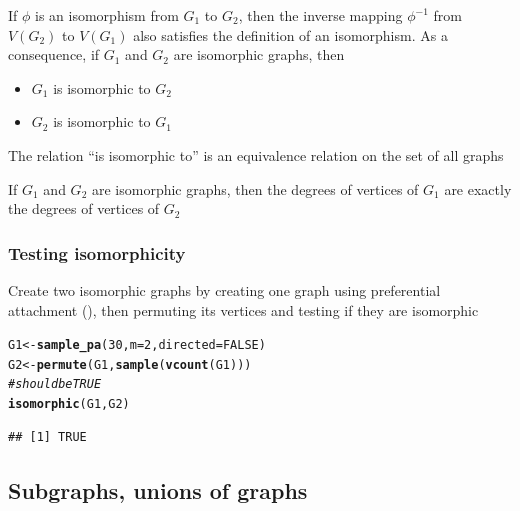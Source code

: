 \documentclass[aspectratio=169]{beamer}\usepackage[]{graphicx}\usepackage[]{xcolor}
\makeatletter
\newcommand{\hlnum}[1]{\textcolor[rgb]{0.686,0.059,0.569}{#1}}%
\newcommand{\hlcom}[1]{\textcolor[rgb]{0.678,0.584,0.686}{\textit{#1}}}%
\newcommand{\hldef}[1]{\textcolor[rgb]{0.345,0.345,0.345}{#1}}%
\newcommand{\hlkwb}[1]{\textcolor[rgb]{0.69,0.353,0.396}{#1}}%
\newcommand{\hlkwc}[1]{\textcolor[rgb]{0.333,0.667,0.333}{#1}}%
\newcommand{\hlkwd}[1]{\textcolor[rgb]{0.737,0.353,0.396}{\textbf{#1}}}%
\newenvironment{kframe}{%
 \def\at@end@of@kframe{}%
 \ifinner\ifhmode%
  \def\at@end@of@kframe{\end{minipage}}%
  \begin{minipage}{\columnwidth}%
 \fi\fi%
 \def\FrameCommand##1{\hskip\@totalleftmargin \hskip-\fboxsep
 \colorbox{shadecolor}{##1}\hskip-\fboxsep
     \hskip-\linewidth \hskip-\@totalleftmargin \hskip\columnwidth}%
 \MakeFramed {\advance\hsize-\width
   \@totalleftmargin\z@ \linewidth\hsize
   \@setminipage}}%
 {\par\unskip\endMakeFramed%
 \at@end@of@kframe}
\newenvironment{knitrout}{}{} %
\makeatother
\begin{document}
 
 
\begin{frame}
If $\phi$ is an isomorphism from $G_1$ to $G_2$, then the inverse mapping $\phi ^{-1}$ from $V(G_2)$ to $V(G_1)$ also satisfies the definition of an isomorphism.
As a consequence, if $G_1$ and $G_2$ are isomorphic graphs, then
\begin{itemize}
\item $G_1$ is isomorphic to $G_2$
\item $G_2$ is isomorphic to $G_1$
\end{itemize}
\vfill
\begin{theorem}
The relation ``is isomorphic to'' is an equivalence relation on the set of all graphs
\end{theorem}
\vfill
\begin{theorem}
If $G_1$ and $G_2$ are isomorphic graphs, then the degrees of vertices of $G_1$ are exactly the degrees of vertices of $G_2$
\end{theorem}
\end{frame}

\begin{frame}[fragile]\frametitle{Testing isomorphicity}
Create two isomorphic graphs by creating one graph using preferential attachment (), then permuting its vertices and testing if they are isomorphic
\vfill
\begin{knitrout}
\color{fgcolor}\begin{kframe}
\begin{alltt}
\hldef{G1} \hlkwb{<-} \hlkwd{sample_pa}\hldef{(}\hlnum{30}\hldef{,} \hlkwc{m} \hldef{=} \hlnum{2}\hldef{,} \hlkwc{directed} \hldef{=} \hlnum{FALSE}\hldef{)}
\hldef{G2} \hlkwb{<-} \hlkwd{permute}\hldef{(G1,} \hlkwd{sample}\hldef{(}\hlkwd{vcount}\hldef{(G1)))}
\hlcom{# should be TRUE}
\hlkwd{isomorphic}\hldef{(G1, G2)}
\end{alltt}
\begin{verbatim}
## [1] TRUE
\end{verbatim}
\end{kframe}
\end{knitrout}
\end{frame}




\subsection{Subgraphs, unions of graphs}
\end{document}

